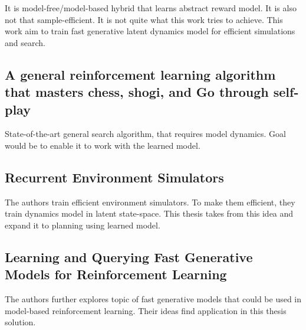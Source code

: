 

It is model-free/model-based hybrid that learns abstract reward model. It is also not that sample-efficient. It is not quite what this work tries to achieve. This work aim to train fast generative latent dynamics model for efficient simulations and search.

\subsection{A general reinforcement learning algorithm that masters chess, shogi, and Go through self-play}



State-of-the-art general search algorithm, that requires model dynamics. Goal would be to enable it to work with the learned model.

\subsection{Recurrent Environment Simulators}



The authors train efficient environment simulators. To make them efficient, they train dynamics model in latent state-space. This thesis takes from this idea and expand it to planning using learned model.

\subsection{Learning and Querying Fast Generative Models for Reinforcement Learning}



The authors further explores topic of fast generative models that could be used in model-based reinforcement learning. Their ideas find application in this thesis solution.
